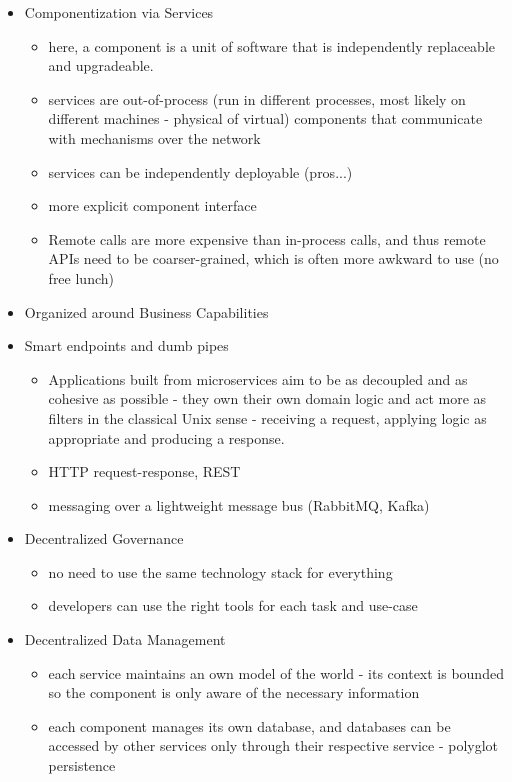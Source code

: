 \begin{itemize}
\begin{itemize}
		\item Componentization via Services
		\begin{itemize}
			\item here, a component is a unit of software that is independently replaceable and upgradeable.
			\item services are out-of-process (run in different processes, most likely on different machines - physical of virtual) components that communicate with mechanisms over the network
			\item services can be independently deployable (pros...)
			\item more explicit component interface
			\item Remote calls are more expensive than in-process calls, and thus remote APIs need to be coarser-grained, which is often more awkward to use (no free lunch)
		\end{itemize}
		\item Organized around Business Capabilities
		\item Smart endpoints and dumb pipes
		\begin{itemize}
			\item Applications built from microservices aim to be as decoupled and as cohesive as possible - they own their own domain logic and act more as filters in the classical Unix sense - receiving a request, applying logic as appropriate and producing a response.
			\item HTTP request-response, REST
			\item messaging over a lightweight message bus (RabbitMQ, Kafka)
		\end{itemize}
		\item Decentralized Governance
		\begin{itemize}
			\item no need to use the same technology stack for everything
			\item developers can use the right tools for each task and use-case
		\end{itemize}
		\item Decentralized Data Management
		\begin{itemize}
			\item each service maintains an own model of the world - its context is bounded so the component is only aware of the necessary information
			\item each component manages its own database, and databases can be accessed by other services only through their respective service - polyglot persistence

\end{itemize}
\end{itemize}
\end{itemize}
